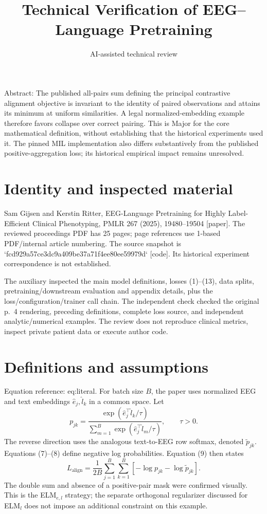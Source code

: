 \documentclass[10pt]{article}
\title{Technical Verification of EEG–Language Pretraining}
\author{AI-assisted technical review}
\date{}
\begin{document}
\maketitle
Abstract: The published all-pairs sum defining the principal contrastive alignment objective is invariant to the identity of paired observations and attains its minimum at uniform similarities. A legal normalized-embedding example therefore favors collapse over correct pairing. This is Major for the core mathematical definition, without establishing that the historical experiments used it. The pinned MIL implementation also differs substantively from the published positive-aggregation loss; its historical empirical impact remains unresolved.\par
\section*{Identity and inspected material}
Sam Gijsen and Kerstin Ritter, EEG-Language Pretraining for Highly Label-Efficient Clinical Phenotyping, PMLR 267 (2025), 19480–19504 [paper]. The reviewed proceedings PDF has 25 pages; page references use 1-based PDF/internal article numbering. The source snapshot is `fcd929a57ce3dc9a409be37a71f4ee80ee59979d` [code]. Its historical experiment correspondence is not established.\par
The auxiliary inspected the main model definitions, losses (1)–(13), data splits, pretraining/downstream evaluation and appendix details, plus the loss/configuration/trainer call chain. The independent check checked the original p. 4 rendering, preceding definitions, complete loss source, and independent analytic/numerical examples. The review does not reproduce clinical metrics, inspect private patient data or execute author code.\par
\section*{Definitions and assumptions}
Equation reference: eq:literal. For batch size \(B\), the paper uses normalized EEG and text embeddings \(\hat e_j,\hat l_k\) in a common space. Let \[p_{jk}=\frac{\exp(\hat e_j^\top\hat l_k/\tau)}
 {\sum_{m=1}^B\exp(\hat e_j^\top\hat l_m/\tau)},\qquad \tau>0.\] The reverse direction uses the analogous text-to-EEG row softmax, denoted \(\widetilde p_{jk}\). Equations (7)–(8) define negative log probabilities. Equation (9) then states \[
L_{\mathrm{align}}
=\frac{1}{2B}\sum_{j=1}^B\sum_{k=1}^B
[-\log p_{jk}-\log\widetilde p_{jk}].\] The double sum and absence of a positive-pair mask were confirmed visually. This is the ELM\(_{e,l}\) strategy; the separate orthogonal regularizer discussed for ELM\(_l\) does not impose an additional constraint on this example.\par
\end{document}
